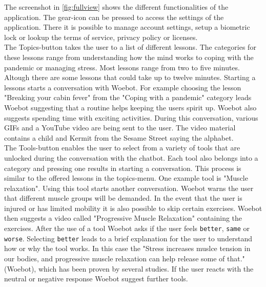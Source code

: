 The screenshot in \autoref{fig:fullview} shows the different functionalities of the application. The gear-icon can be pressed to access the settings of the application. There it is possible to manage account settings, setup a biometric lock or lookup the terms of service, privacy policy or licenses.\\

The Topics-button takes the user to a list of different lessons. The categories for these lessons range from understanding how the mind works to coping with the pandemic or managing stress. Most lessons range from two to five minutes. Altough there are some lessons that could take up to twelve minutes. Starting a lessons starts a conversation with Woebot. For example choosing the lesson "Breaking your cabin fever" from the "Coping with a pandemic" category leads Woebot suggesting that a routine helps keeping the users spirit up. Woebot also suggests spending time with exciting activities. During this conversation, various GIFs and a YouTube video are being sent to the user. The video material contains a child and Kermit from the Sesame Street saying the alphabet. \\

The Tools-button enables the user to select from a variety of tools that are unlocked during the conversation with the chatbot. Each tool also belongs into a category and pressing one results in starting a conversation. This process is similar to the offered lessons in the topics-menu. One example tool is "Muscle relaxation". Using this tool starts another conversation. Woebot warns the user that different muscle groups will be demanded. In the event that the user is injured or has limited mobility it is also possible to skip certain exercises. Woebot then suggests a video called "Progressive Muscle Relaxation" containing the exercises. After the use of a tool Woebot asks if the user feels \texttt{better}, \texttt{same} or \texttt{worse}. Selecting \texttt{better} leads to a brief explanation for the user to understand how or why the tool works. In this case the "Stress increases muslce tension in our bodies, and progressive muscle relaxation can help release some of that." (Woebot), which has been proven by several studies\cite{progressive-muscle, stress-pmr}. If the user reacts with the neutral or negative response Woebot suggest further tools.




